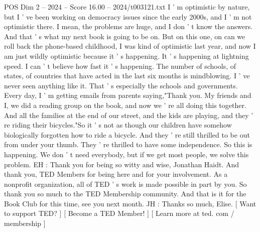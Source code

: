 \begin{textsample}{POS Dim 2 – 2024 – Score 16.00 – 2024/t003121.txt}
I ' m optimistic by nature, but I ' ve been working on democracy issues since the early 2000s, and I ' m not optimistic there.
I mean, the problems are huge, and I don ' t know the answers.
And that ' s what my next book is going to be on.
But on this one, on can we roll back the phone-based childhood, I was kind of optimistic last year, and now I am just wildly optimistic because it ' s happening.
It ' s happening at lightning speed.
I can ' t believe how fast it ' s happening.
The number of schools, of states, of countries that have acted in the last six months is mindblowing.
I ' ve never seen anything like it.
That ' s especially the schools and governments.
Every day, I ' m getting emails from parents saying,"Thank you.
My friends and I, we did a reading group on the book, and now we ' re all doing this together.
And all the families at the end of our street, and the kids are playing, and they ' re riding their bicycles."So it ' s not as though our children have somehow biologically forgotten how to ride a bicycle.
And they ' re still thrilled to be out from under your thumb.
They ' re thrilled to have some independence.
So this is happening.
We don ' t need everybody, but if we get most people, we solve this problem.
EH : Thank you for being so witty and wise, Jonathan Haidt.
And thank you, TED Members for being here and for your involvement.
As a nonprofit organization, all of TED ' s work is made possible in part by you.
So thank you so much to the TED Membership community.
And that is it for the Book Club for this time, see you next month.
JH : Thanks so much, Elise. [ Want to support TED? ] [ Become a TED Member! ] [ Learn more at ted. com / membership ]

\end{textsample}
